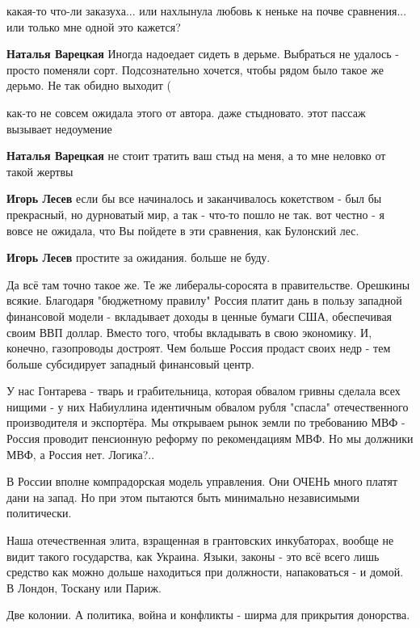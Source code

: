 \begin{itemize}
\begin{itemize}
какая-то что-ли заказуха... или нахлынула любовь к неньке на почве сравнения... или только мне одной это кажется?

\textbf{Наталья Варецкая} Иногда надоедает сидеть в дерьме. Выбраться не удалось - просто поменяли сорт. Подсознательно хочется, чтобы рядом было такое же дерьмо. Не так обидно выходит (

как-то не совсем ожидала этого от автора.
даже стыдновато.
этот пассаж вызывает недоумение

\textbf{Наталья Варецкая} не стоит тратить ваш стыд на меня, а то мне неловко от такой жертвы

\textbf{Игорь Лесев} если бы все начиналось и заканчивалось кокетством - был бы прекрасный, но дурноватый мир, а так - что-то пошло не так.
вот честно - я вовсе не ожидала, что Вы пойдете в эти сравнения, как Булонский лес.

\textbf{Игорь Лесев} простите за ожидания. больше не буду.
\end{itemize} %


Да всё там точно такое же. Те же либералы-соросята в правительстве. Орешкины
всякие. Благодаря "бюджетному правилу" Россия платит дань в пользу западной
финансовой модели - вкладывает доходы в ценные бумаги США, обеспечивая своим
ВВП доллар. Вместо того, чтобы вкладывать в свою экономику. И, конечно,
газопроводы достроят. Чем больше Россия продаст своих недр - тем больше
субсидирует западный финансовый центр.

У нас Гонтарева - тварь и грабительница, которая обвалом гривны сделала всех
нищими - у них Набиуллина идентичным обвалом рубля "спасла" отечественного
производителя и экспортёра. Мы открываем рынок земли по требованию МВФ - Россия
проводит пенсионную реформу по рекомендациям МВФ. Но мы должники МВФ, а Россия
нет. Логика?..

В России вполне компрадорская модель управления. Они ОЧЕНЬ много платят дани на
запад. Но при этом пытаются быть минимально независимыми политически.

Наша отечественная элита, взращенная в грантовских инкубаторах, вообще не видит
такого государства, как Украина. Языки, законы - это всё всего лишь средство
как можно дольше находиться при должности, напаковаться - и домой. В Лондон,
Тоскану или Париж.

Две колонии. А политика, война и конфликты - ширма для прикрытия донорства.


\end{itemize}
